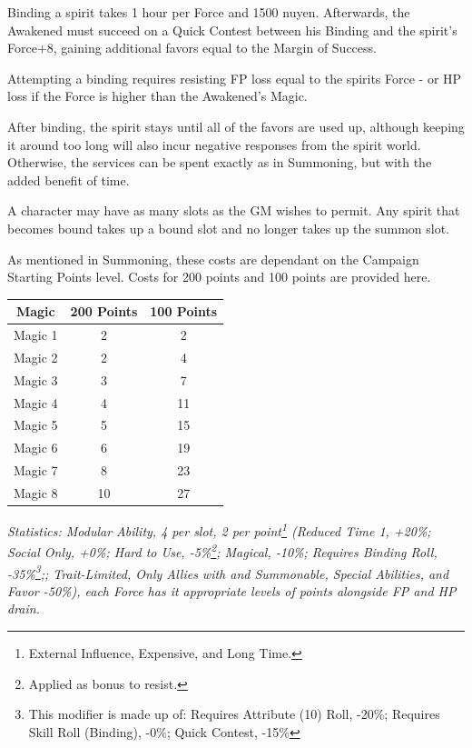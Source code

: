 \begin{multicols*}{3}
	Binding a spirit takes 1 hour per Force and 1500 nuyen. Afterwards, the Awakened must succeed on a Quick Contest between his Binding and the spirit's Force+8, gaining additional favors equal to the Margin of Success.
	
	Attempting a binding requires resisting FP loss equal to the spirits Force - or HP loss if the Force is higher than the Awakened's Magic. 
	
	After binding, the spirit stays until all of the favors are used up, although keeping it around too long will also incur negative responses from the spirit world. Otherwise, the services can be spent exactly as in Summoning, but with the added benefit of time.
	
	A character may have as many slots as the GM wishes to permit. Any spirit that becomes bound takes up a bound slot and no longer takes up the summon slot.
	
	As mentioned in Summoning, these costs are dependant on the Campaign Starting Points level. Costs for 200 points and 100 points are provided here.
	
	\begin{center}
		\begin{tabular}{|c|c|c|}
			\hline
			Magic & 200 Points & 100 Points \\
			\hline
			\hline
			Magic 1 & 2 & 2 \\
			Magic 2 & 2 & 4 \\
			Magic 3 & 3 & 7 \\
			Magic 4 & 4 & 11 \\
			Magic 5 & 5 & 15 \\
			Magic 6 & 6 & 19 \\
			Magic 7 & 8 & 23 \\
			Magic 8 & 10 & 27 \\
			\hline
		\end{tabular}
	\end{center}
	
	\textit{\textcolor{OliveGreen}{Statistics: Modular Ability, 4 per slot, 2 per point\footnote{External Influence, Expensive, and Long Time.} (Reduced Time 1, +20\%; Social Only, +0\%; Hard to Use, -5\%\footnote{Applied as bonus to resist.}; Magical, -10\%; Requires Binding Roll, -35\%\footnote{This modifier is made up of: Requires Attribute (10) Roll, -20\%; Requires Skill Roll (Binding), -0\%; Quick Contest, -15\%};; Trait-Limited, Only Allies with and Summonable, Special Abilities, and Favor -50\%), each Force has it appropriate levels of points alongside FP and HP drain.}}
	

\end{multicols*}
